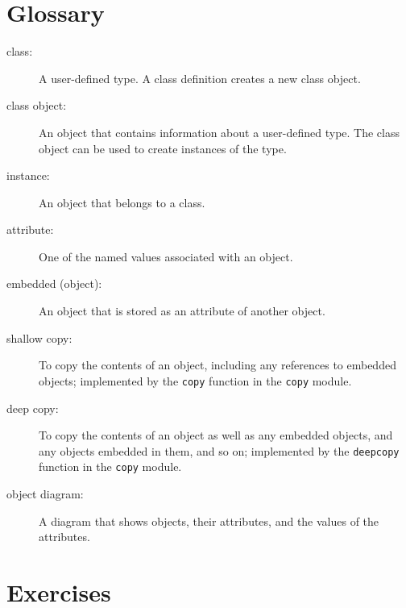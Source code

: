 \documentclass[10pt]{book}
\begin{document}
\section{Glossary}

\begin{description}

\item[class:] A user-defined type.  A class definition creates a new
class object.

\item[class object:] An object that contains information about a
user-defined type.  The class object can be used to create instances
of the type.

\item[instance:] An object that belongs to a class.

\item[attribute:] One of the named values associated with an object.

\item[embedded (object):] An object that is stored as an attribute
of another object.

\item[shallow copy:] To copy the contents of an object, including
any references to embedded objects;
implemented by the {\tt copy} function in the {\tt copy} module.

\item[deep copy:] To copy the contents of an object as well as any
embedded objects, and any objects embedded in them, and so on;
implemented by the {\tt deepcopy} function in the {\tt copy} module.

\item[object diagram:] A diagram that shows objects, their
attributes, and the values of the attributes.

\end{description}


\section{Exercises}
\end{document}
